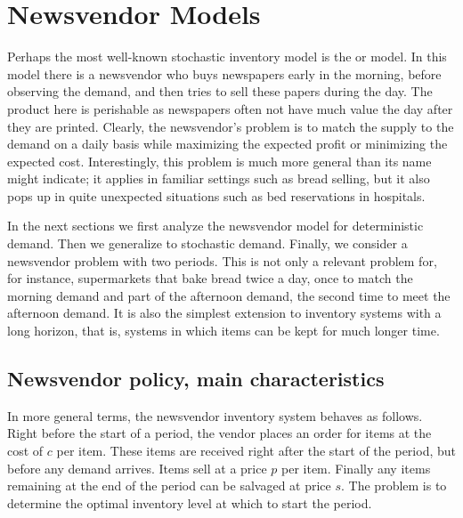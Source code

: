 \newcommand{\Q}{S}

\section{Newsvendor Models}
\label{sec:newsvendor-models}




Perhaps the most well-known stochastic inventory model is the  or  model.  In this model there is a  newsvendor who buys newspapers early in the morning, before observing the demand, and then tries to sell these papers during the day. 
The product here is perishable as newspapers often not have much value the day after they are printed. %
Clearly,  the newsvendor's problem is to match the supply to the demand on a daily basis while maximizing the expected profit or minimizing the expected cost. Interestingly, this problem is much more general than its name might indicate; it applies in familiar settings such as bread selling, but it also pops up  in quite unexpected situations such as bed reservations in hospitals. 


In the next sections we first analyze the newsvendor model for deterministic demand. Then we generalize to stochastic demand.
Finally, we consider a newsvendor problem with two periods. This is not only a relevant problem for, for instance, supermarkets that bake bread twice a day, once to match the morning demand and part of the afternoon demand, the second time to meet the afternoon demand. It is also the simplest extension to inventory systems with a long horizon, that is, systems in which items can be kept for much longer time. 


\subsection{Newsvendor policy, main characteristics}
\label{sec:policy-parameters}

In more general terms, the newsvendor  inventory system behaves as follows. Right before the start of a period, the vendor places an order for items at the cost of $c$ per item. These items are received right after the start of the period, but before any demand arrives. Items sell at a price $p$ per item. Finally any items remaining at the end of the period can be salvaged at price $s$. The problem is to determine the optimal inventory level at which to start the period. 

